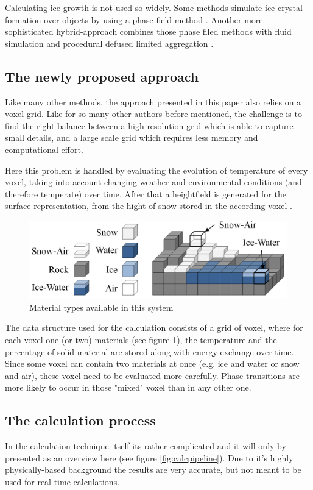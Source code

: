 Calculating ice growth is not used so widely. Some methods simulate ice crystal formation over objects by using a phase field method \cite{kim2003visual}. Another more sophisticated hybrid-approach combines those phase filed methods with fluid simulation and procedural defused limited aggregation \cite{kim2004hybrid}.

\subsection{The newly proposed approach}
Like many other methods, the approach presented in this paper \cite{benes2001layered} also relies on a voxel grid. Like for so many other authors before mentioned, the challenge is to find the right balance between a high-resolution grid which is able to capture small details, and a large scale grid which requires less memory and computational effort.

Here this problem is handled by evaluating the evolution of temperature of every voxel, taking into account changing weather and environmental conditions (and therefore temperate) over time. After that a heightfield is generated for the surface representation, from the hight of snow stored in the according voxel \cite{benes2001layered}.

\begin{figure}[htb]
	\centering
	\includegraphics[width=\linewidth]{BF01/84941_1.png}
	\caption{Material types available in this system}
	\label{fig:materialtypes}
\end{figure}

The data structure used for the calculation consists of a grid of voxel, where for each voxel one (or two) materials (see figure \ref{fig:materialtypes}), the temperature and the percentage of solid material are stored along with energy exchange over time. Since some voxel can contain two materials at once (e.g. ice and water or snow and air), these voxel need to be evaluated more carefully. Phase transitions are more likely to occur in those "mixed" voxel than in any other one.

\subsection{The calculation process}
In the calculation technique itself its rather complicated and it will only by presented as an overview here (see figure \ref{fig:calcpipeline}). Due to it's highly physically-based background the results are very accurate, but not meant to be used for real-time calculations.

